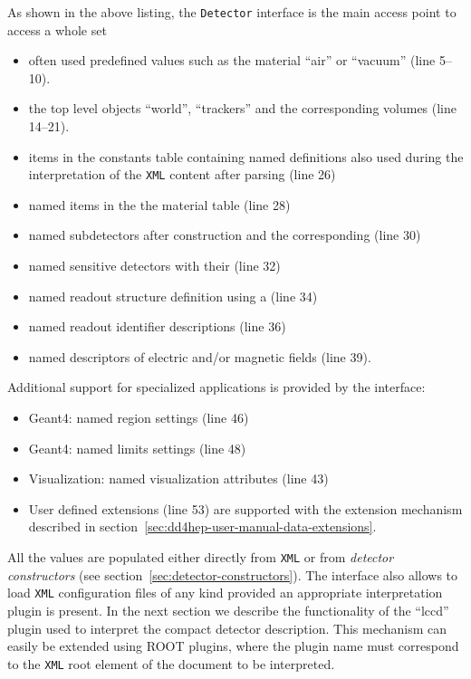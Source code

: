 As shown in the above listing, the \texttt{Detector} interface is the main access point to access a whole set 
\begin{itemize}
\item often used predefined values such as the material ``air'' or ``vacuum'' (line 5--10).
\item the top level objects ``world'', ``trackers'' and the corresponding volumes (line 14--21).
\item items in the constants table containing named definitions also used during the interpretation of the \texttt{XML} content after parsing (line 26)
\item named items in the the material table (line 28)
\item named subdetectors after construction and the corresponding (line 30)
\item named sensitive detectors with their (line 32)
\item named readout structure definition using a (line 34)
\item named readout identifier descriptions (line 36)
\item named descriptors of electric and/or magnetic fields  (line 39).
\end{itemize}
Additional support for specialized applications is provided by the interface:
\begin{itemize}
\item Geant4: named region settings  (line 46)
\item Geant4: named limits settings  (line 48)
\item Visualization: named visualization attributes  (line 43)
\item User defined extensions (line 53) are supported with the extension mechanism described in section~\ref{sec:dd4hep-user-manual-data-extensions}.
\end{itemize}

All the values are populated either directly from \texttt{XML} or from \textit{detector constructors} (see section~\ref{sec:detector-constructors}). The interface also allows to load \texttt{XML} configuration files of any kind provided an appropriate  interpretation plugin is present. In the next section we describe the functionality  of the ``lccd'' plugin used to interpret the compact detector description. This mechanism can easily be extended using ROOT plugins, where the plugin name must correspond to the \texttt{XML} root element of the document to be interpreted.

